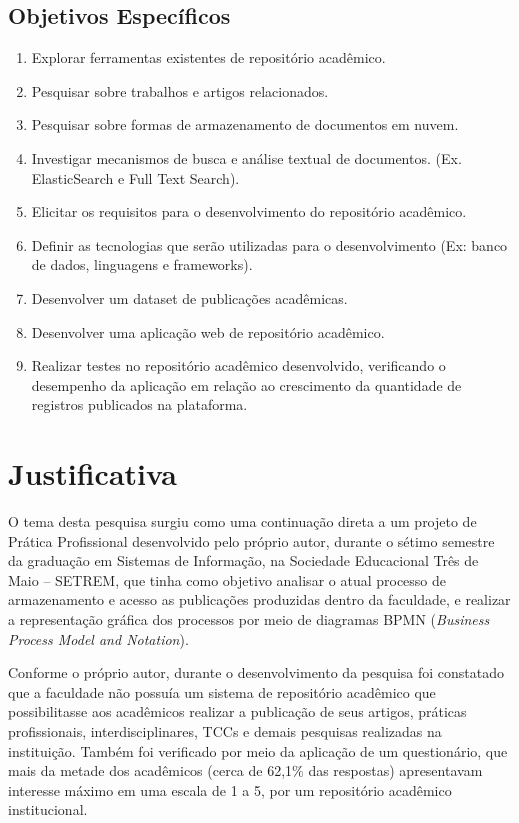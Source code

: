 \subsection{Objetivos Específicos}
\begin{enumerate}
    \item Explorar ferramentas existentes de repositório acadêmico.
    \item Pesquisar sobre trabalhos e artigos relacionados.
    \item Pesquisar sobre formas de armazenamento de documentos em nuvem.
    \item Investigar mecanismos de busca e análise textual de documentos. (Ex. ElasticSearch e Full Text Search).
    \item Elicitar os requisitos para o desenvolvimento do repositório acadêmico.
    \item Definir as tecnologias que serão utilizadas para o desenvolvimento (Ex: banco de dados, linguagens e frameworks).
    \item Desenvolver um dataset de publicações acadêmicas.
    \item Desenvolver uma aplicação web de repositório acadêmico.
    \item Realizar testes no repositório acadêmico desenvolvido, verificando o desempenho da aplicação em relação ao crescimento da quantidade de registros publicados na plataforma.

\end{enumerate}


\section{Justificativa}\label{sec:justification}

O tema desta pesquisa surgiu como uma continuação direta a um projeto
de Prática Profissional desenvolvido pelo próprio autor, durante o sétimo
semestre da graduação em Sistemas de Informação, na Sociedade Educacional
Três de Maio – SETREM, que tinha como objetivo analisar o atual processo
de armazenamento e acesso as publicações produzidas dentro da faculdade,
e realizar a representação gráfica dos processos por meio de diagramas BPMN
(\emph{Business Process Model and Notation}).

Conforme o próprio autor, durante o desenvolvimento da pesquisa foi constatado que a faculdade
não possuía um sistema de repositório acadêmico que possibilitasse aos
acadêmicos realizar a publicação de seus artigos, práticas profissionais,
interdisciplinares, TCCs e demais pesquisas realizadas na instituição.
Também foi verificado por meio da aplicação de um questionário, que
mais da metade dos acadêmicos (cerca de 62,1\% das respostas) apresentavam
interesse máximo em uma escala de 1 a 5, por um repositório acadêmico
institucional.

